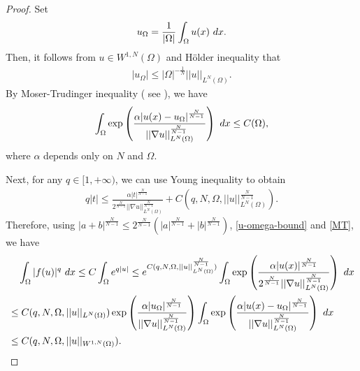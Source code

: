 \documentclass[10pt,a4paper]{amsart}
\numberwithin{equation}{section}
\newcommand{\pa}{\partial}
\newcommand{\R}{\mathbb{R}}
\newcommand{\e}{\textup{e}}
\newcommand{\dx}{\textup{d}x}
\begin{document}
\begin{proof}
    Set
    \begin{align*}
        u_{\Omega} = \frac{1}{|\Omega|} \int_{\Omega} u(x) \ \dx. %
    \end{align*}
    Then, it follows from $u \in W^{1,N}(\Omega)$ and  H\"{o}lder inequality that
    \begin{align}\label{u-omega-bound}
        |u_{\Omega}| \leq |\Omega|^{-\frac{1}{N}}||u||_{L^N(\Omega)}. %
    \end{align}
    By  Moser-Trudinger inequality ( see \cite{C2008}),  we have
    \begin{align}\label{MT}
        \int_{\Omega} \exp\left(\frac{\alpha |u(x) - u_{\Omega}|^{\frac{N}{N-1}}}{||\nabla u||_{L^N(\Omega)}^{\frac{N}{N-1}}} \right)  \ \dx \leq C(\Omega) ,%
    \end{align}
    where $\alpha$  depends only on $N$ and $\Omega$. 
    
    Next, for any $q \in [1,+\infty)$, we can use Young inequality to obtain
    \begin{align*}
        q|t| \leq  \frac{\alpha|t|^{\frac{N}{N-1}}}{2^{\frac{N}{N-1}}||\nabla u ||_{L^{N}(\Omega)}^{\frac{N}{N-1}}} + C(q, N , \Omega, ||u||_{L^{N}(\Omega)}^{\frac{N}{N-1}}).
    \end{align*}
    Therefore, using $|a+b|^{\frac{N}{N-1}} \leq 2^{\frac{N}{N-1}}(|a|^{\frac{N}{N-1}} + |b|^{\frac{N}{N-1}})$, \eqref{u-omega-bound} and \eqref{MT}, we have
    \begin{align}\label{f-Lq}
       &\quad \int_{\Omega}  |f(u)|^q \ \dx \leq C\int_{\Omega} \e^{q|u|}   \leq e^{C(q,N, \Omega, ||u||_{L^{N}(\Omega)}^{\frac{N}{N-1}})} \int_{\Omega} \exp\left( \frac{\alpha|u(x)|^{\frac{N}{N-1}}}{2^{\frac{N}{N-1}}||\nabla u ||_{L^{N}(\Omega)}^{\frac{N}{N-1}}} \right) \ \dx \nonumber\\
        & \leq C(q,N, \Omega, ||u||_{L^N(\Omega)})\exp\left( \frac{\alpha|u_{\Omega}|^{\frac{N}{N-1}}}{||\nabla u ||_{L^{N}(\Omega)}^{\frac{N}{N-1}}} \right)\int_{\Omega} \exp\left( \frac{\alpha|u(x) - u_{\Omega}|^{\frac{N}{N-1}}}{||\nabla u ||_{L^{N}(\Omega)}^{\frac{N}{N-1}}} \right) \ \dx \nonumber\\
         & \leq C(q,N, \Omega, ||u||_{W^{1,N}(\Omega)}).
    \end{align}


\end{proof}
\end{document}
